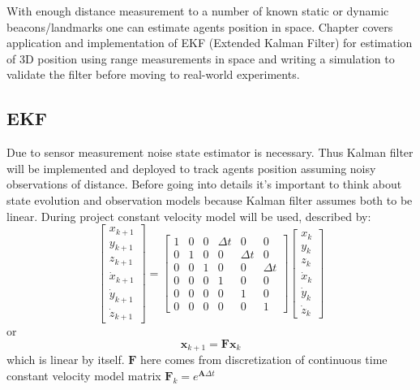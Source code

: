 With enough distance measurement to a number of known static or dynamic beacons/landmarks one can estimate agents position in space. Chapter covers application and implementation of EKF (Extended Kalman Filter) for estimation of 3D position using range measurements in space and writing a simulation to validate the filter before moving to real-world experiments.

\subsection{EKF}

Due to sensor measurement noise state estimator is necessary. Thus Kalman filter will be implemented and deployed to track agents position assuming noisy observations of distance. Before going into details it's important to think about state evolution and observation models because Kalman filter assumes both to be linear. During project constant velocity model will be used, described by:
$$
    \left[\begin{array}{c}
            x_{k+1}       \\
            y_{k+1}       \\
            z_{k+1}       \\
            \dot{x}_{k+1} \\
            \dot{y}_{k+1} \\
            \dot{z}_{k+1}
        \end{array}\right]=\left[\begin{array}{cccccc}
            1 & 0 & 0 & \Delta t & 0        & 0        \\
            0 & 1 & 0 & 0        & \Delta t & 0        \\
            0 & 0 & 1 & 0        & 0        & \Delta t \\
            0 & 0 & 0 & 1        & 0        & 0        \\
            0 & 0 & 0 & 0        & 1        & 0        \\
            0 & 0 & 0 & 0        & 0        & 1
        \end{array}\right]\left[\begin{array}{c}
            x_{k}       \\
            y_{k}       \\
            z_{k}       \\
            \dot{x}_{k} \\
            \dot{y}_{k} \\
            \dot{z}_{k}
        \end{array}\right]
$$
or
$$
    \boldsymbol{x}_{k+1} = \boldsymbol{F} \boldsymbol{x}_k
$$
which is linear by itself. $\boldsymbol{F}$ here comes from discretization of continuous time constant velocity model matrix $\mathbf{F}_k=e^{\mathbf{A} \Delta t}$

